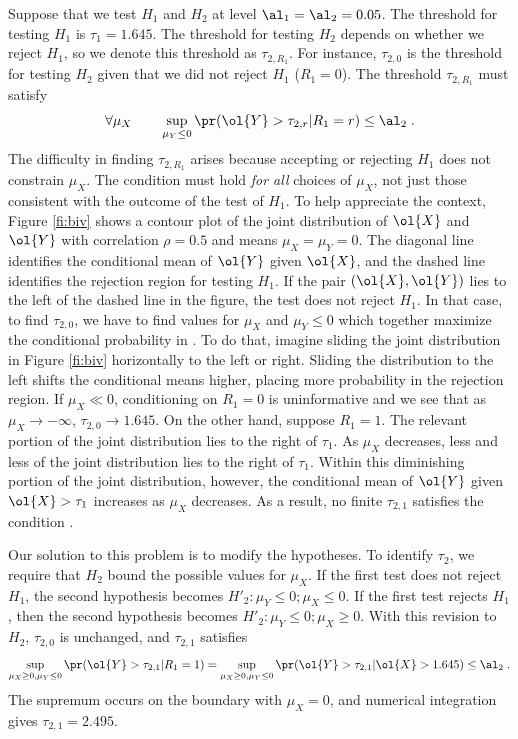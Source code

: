 \documentclass[12pt]{article}
\begin{document}
 Suppose that we test $H_1$ and $H_2$ at level $\al_1 = \al_2 = 0.05$.  The
 threshold for testing $H_1$ is $\tau_1 = 1.645$.  The threshold for testing
 $H_2$ depends on whether we reject $H_1$, so we denote this threshold as
 $\tau_{2,R_1}$.  For instance, $\tau_{2,0}$ is the threshold for testing $H_2$
 given that we did not reject $H_1$ ($R_1 = 0$). The threshold $\tau_{2,R_1}$
 must satisfy
\begin{equation}
\label{eq:sup1}
  \forall \mu_X \qquad \sup_{\mu_Y \le 0} \pr(\ol{Y} > \tau_{2,r} | R_1=r) \le
 \al_2\;.
\end{equation}
 The difficulty in finding $\tau_{2,R_1}$ arises because accepting or rejecting
 $H_1$ does not constrain $\mu_X$.  The condition  must hold {\em
 for all} choices of $\mu_X$, not just those consistent with the outcome of the
 test of $H_1$.  To help appreciate the context, Figure \ref{fi:biv} shows a
 contour plot of the joint distribution of $\ol{X}$ and $\ol{Y}$ with
 correlation $\rho = 0.5$ and means $\mu_X = \mu_Y = 0$.  The diagonal line
 identifies the conditional mean of $\ol{Y}$ given $\ol{X}$, and the dashed line
 identifies the rejection region for testing $H_1$.  If the pair
 $(\ol{X},\ol{Y})$ lies to the left of the dashed line in the figure, the test
 does not reject $H_1$.  In that case, to find $\tau_{2,0}$, we have to find
 values for $\mu_X$ and $\mu_Y \le 0$ which together maximize the conditional
 probability in .  To do that, imagine sliding the joint
 distribution in Figure \ref{fi:biv} horizontally to the left or right.  Sliding
 the distribution to the left shifts the conditional means higher, placing more
 probability in the rejection region.  If $\mu_X \ll 0$, conditioning on $R_1 =
 0$ is uninformative and we see that as $\mu_X \rightarrow -\infty$, $\tau_{2,0}
 \rightarrow 1.645$.  On the other hand, suppose $R_1 = 1$.  The relevant
 portion of the joint distribution lies to the right of $\tau_1$.  As $\mu_X$
 decreases, less and less of the joint distribution lies to the right of
 $\tau_1$.  Within this diminishing portion of the joint distribution, however,
 the conditional mean of $\ol{Y}$ given $\ol{X} > \tau_1$ increases as $\mu_X$
 decreases.  As a result, no finite $\tau_{2,1}$ satisfies the condition
 .



 Our solution to this problem is to modify the hypotheses.  To identify
 $\tau_2$, we require that $H_2$ bound the possible values for $\mu_X$.  If the
 first test does not reject $H_1$, the second hypothesis becomes $H'_2: \mu_Y
 \le 0; \mu_X \le 0$.  If the first test rejects $H_1$, then the second
 hypothesis becomes $H'_2: \mu_Y \le 0; \mu_X \ge 0$.  With this revision to
 $H_2$, $\tau_{2,0}$ is unchanged, and $\tau_{2,1}$ satisfies
\begin{equation}
   \sup_{\mu_X \ge 0, \mu_Y \le 0} \pr(\ol{Y} > \tau_{2,1} | R_1=1) 
    =   \sup_{\mu_X \ge 0, \mu_Y \le 0} \pr(\ol{Y} > \tau_{2,1} | \ol{X}>1.645) 
    \le \al_2\;.
\label{eq:sup2}
\end{equation}
 The supremum occurs on the boundary with $\mu_X = 0$, and numerical integration
 gives $\tau_{2,1} = 2.495$.  
\end{document}
